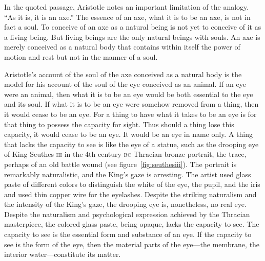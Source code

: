 In the quoted passage, Aristotle notes an important limitation of the analogy. ``As it is, it is an axe.'' The essence of an axe, what it is to be an axe, is not in fact a soul. To conceive of an axe as a natural being is not yet to conceive of it as a living being. But living beings are the only natural beings with souls. An axe is merely conceived as a natural body that contains within itself the power of motion and rest but not in the manner of a soul.







Aristotle's account of the soul of the axe conceived as a natural body is the model for his account of the soul of the eye conceived as an animal. If an eye were an animal, then what it is to be an eye would be both essential to the eye and its soul. If what it is to be an eye were somehow removed from a thing, then it would cease to be an eye. For a thing to have what it takes to be an eye is for that thing to possess the capacity for sight. Thus should a thing lose this capacity, it would cease to be an eye. It would be an eye in name only. A thing that lacks the capacity to see is like the eye of a statue, such as the drooping eye of King Seuthes \textsc{iii} in the 4th century \textsc{bc} Thracian bronze portrait, the trace, perhaps of an old battle wound (see figure~\ref{fig:seuthesiii}). The portrait is remarkably naturalistic, and the King's gaze is arresting. The artist used glass paste of different colors to distinguish the white of the eye, the pupil, and the iris and used thin copper wire for the eyelashes. Despite the striking naturalism and the intensity of the King's gaze, the drooping eye is, nonetheless, no real eye. Despite the naturalism and psychological expression achieved by the Thracian masterpiece, the colored glass paste, being opaque, lacks the capacity to see. The capacity to see is the essential form and substance of an eye. If the capacity to see is the form of the eye, then the material parts of the eye---the membrane, the interior water---constitute its matter.


